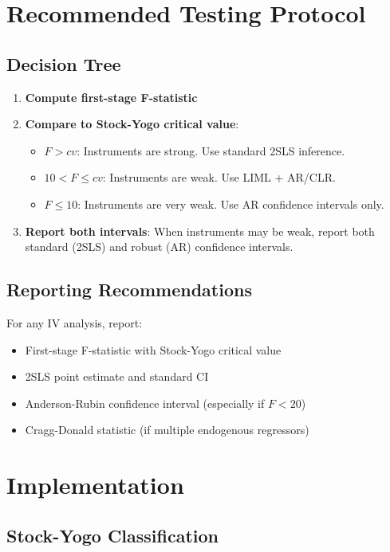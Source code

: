 \section{Recommended Testing Protocol}
\label{sec:weak_protocol}

\subsection{Decision Tree}

\begin{enumerate}
    \item \textbf{Compute first-stage F-statistic}
    \item \textbf{Compare to Stock-Yogo critical value}:
    \begin{itemize}
        \item $F > cv$: Instruments are strong. Use standard 2SLS inference.
        \item $10 < F \leq cv$: Instruments are weak. Use LIML + AR/CLR.
        \item $F \leq 10$: Instruments are very weak. Use AR confidence intervals only.
    \end{itemize}
    \item \textbf{Report both intervals}: When instruments may be weak, report both standard (2SLS) and robust (AR) confidence intervals.
\end{enumerate}

\subsection{Reporting Recommendations}

For any IV analysis, report:
\begin{itemize}
    \item First-stage F-statistic with Stock-Yogo critical value
    \item 2SLS point estimate and standard CI
    \item Anderson-Rubin confidence interval (especially if $F < 20$)
    \item Cragg-Donald statistic (if multiple endogenous regressors)
\end{itemize}


\section{Implementation}
\label{sec:weak_implementation}

\subsection{Stock-Yogo Classification}

